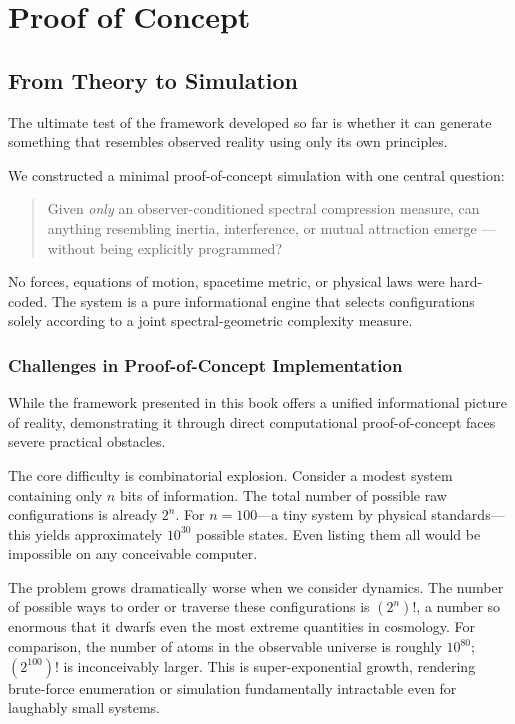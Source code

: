 \chapter{Proof of Concept}
\label{chap:proof-of-concept}

\section{From Theory to Simulation}

The ultimate test of the framework developed so far is whether it can generate something that resembles observed reality using only its own principles.

We constructed a minimal proof-of-concept simulation with one central question:

\begin{quote}
Given \emph{only} an observer-conditioned spectral compression measure, can anything resembling inertia, interference, or mutual attraction emerge — without being explicitly programmed?
\end{quote}

No forces, equations of motion, spacetime metric, or physical laws were hard-coded.
The system is a pure informational engine that selects configurations solely according to a joint spectral-geometric complexity measure.


\subsection{Challenges in Proof-of-Concept Implementation}

While the framework presented in this book offers a unified informational picture of reality, demonstrating it through direct computational proof-of-concept faces severe practical obstacles.

The core difficulty is combinatorial explosion. Consider a modest system containing only \(n\) bits of information. The total number of possible raw configurations is already \(2^n\). For \(n = 100\)—a tiny system by physical standards—this yields approximately \(10^{30}\) possible states.
Even listing them all would be impossible on any conceivable computer.

The problem grows dramatically worse when we consider dynamics.
The number of possible ways to order or traverse these configurations is \((2^n)!\), a number so enormous that it dwarfs even the most extreme quantities in cosmology.
For comparison, the number of atoms in the observable universe is roughly \(10^{80}\); \((2^{100})!\) is inconceivably larger.
This is super-exponential growth, rendering brute-force enumeration or simulation fundamentally intractable even for laughably small systems.

